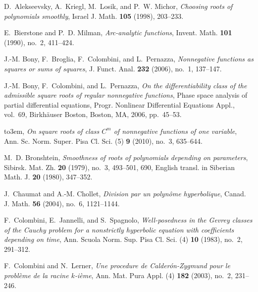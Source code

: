 \documentclass[12pt]{amsart}
\theoremstyle{plain}
\theoremstyle{definition}
\numberwithin{equation}{section}
\begin{document}
\providecommand{\bysame}{\leavevmode\hbox to3em{\hrulefill}\thinspace}
\providecommand{\MR}{\relax\ifhmode\unskip\space\fi MR }
\providecommand{\MRhref}[2]{  \href{http://www.ams.org/mathscinet-getitem?mr=#1}{#2}
}
\providecommand{\href}[2]{#2}
\begin{thebibliography}{10}

D.~Alekseevsky, A.~Kriegl, M.~Losik, and P.~W. Michor, \emph{Choosing roots of
  polynomials smoothly}, Israel J. Math. \textbf{105} (1998), 203--233.

E.~Bierstone and P.~D. Milman, \emph{Arc-analytic functions}, Invent. Math.
  \textbf{101} (1990), no.~2, 411--424.

J.-M. Bony, F.~Broglia, F.~Colombini, and L.~Pernazza, \emph{Nonnegative
  functions as squares or sums of squares}, J. Funct. Anal. \textbf{232}
  (2006), no.~1, 137--147.

J.-M. Bony, F.~Colombini, and L.~Pernazza, \emph{On the differentiability class
  of the admissible square roots of regular nonnegative functions}, Phase space
  analysis of partial differential equations, Progr. Nonlinear Differential
  Equations Appl., vol.~69, Birkh\"auser Boston, Boston, MA, 2006, pp.~45--53.

\bysame, \emph{On square roots of class {$C^m$} of nonnegative functions of one
  variable}, Ann. Sc. Norm. Super. Pisa Cl. Sci. (5) \textbf{9} (2010), no.~3,
  635--644. 

M.~D. Bronshtein, \emph{Smoothness of roots of polynomials depending on
  parameters}, Sibirsk. Mat. Zh. \textbf{20} (1979), no.~3, 493--501, 690,
  English transl. in Siberian Math. J. \textbf{20} (1980), 347--352.

J.~Chaumat and A.-M. Chollet, \emph{Division par un polyn\^ome hyperbolique},
  Canad. J. Math. \textbf{56} (2004), no.~6, 1121--1144.

F.~Colombini, E.~Jannelli, and S.~Spagnolo, \emph{Well-posedness in the
  {G}evrey classes of the {C}auchy problem for a nonstrictly hyperbolic
  equation with coefficients depending on time}, Ann. Scuola Norm. Sup. Pisa
  Cl. Sci. (4) \textbf{10} (1983), no.~2, 291--312.

F.~Colombini and N.~Lerner, \emph{Une procedure de {C}alder\'on-{Z}ygmund pour
  le probl\`eme de la racine {$k$}-i\`eme}, Ann. Mat. Pura Appl. (4)
  \textbf{182} (2003), no.~2, 231--246.


\end{thebibliography}
\end{document}
